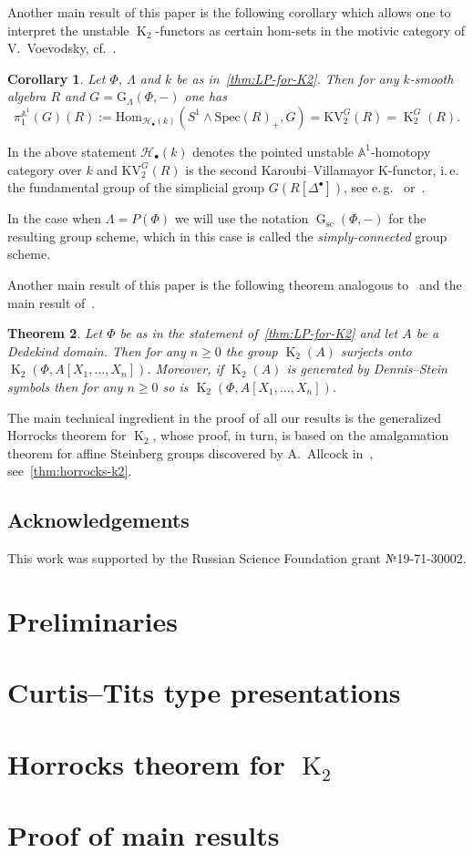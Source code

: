\documentclass[oneside, 10pt]{amsart}
\DeclareMathOperator{\G}{G}
\newcommand{\Gsc}{\G_\mathrm{sc}}
\DeclareMathOperator{\K}{K}
\newtheorem{thm}{Theorem}
\numberwithin{equation}{section}
\numberwithin{thm}{section}
\numberwithin{lemma}{section}
\newtheorem{cor}[thm]{Corollary}
\theoremstyle{definition}
\theoremstyle{remark}
\begin{document}
Another main result of this paper is the following corollary which allows one to
 interpret the unstable $\K_2$-functors as certain hom-sets in the motivic category of V.~Voevodsky,
 cf.~\cite[Corollary~1.2]{LSV2}.
\begin{cor} \label{cor:motivic-pi1} Let $\Phi$, $\Lambda$ and $k$ be as in~\cref{thm:LP-for-K2}.
Then for any $k$-smooth algebra $R$ and $G = \mathrm{G}_{\Lambda}(\Phi, -)$ one has
\[ \pi_1^{\mathbb{A}^1}(G)(R) := \mathrm{Hom}_{\mathscr{H}_{\bullet}(k)}(S^1 \wedge \mathrm{Spec}(R)_+, G) = \mathrm{KV}_2^{G}(R) = \K_2^G(R).\]
\end{cor}
In the above statement $\mathscr{H}_\bullet(k)$ denotes the pointed unstable $\mathbb{A}^1$-homotopy category over $k$ and
$\mathrm{KV}_2^{G}(R)$ is the second Karoubi--Villamayor K-functor, i.\,e. the fundamental group of
 the simplicial group $G(R[\Delta^\bullet])$, see e.\,g.~\cite[\S~3]{Jar83} or~\cite[\S~3.2]{LSV2}.

In the case when $\Lambda = P(\Phi)$ we will use the notation $\Gsc(\Phi, -)$ for the resulting group scheme,
which in this case is called the \textit{simply-connected} group scheme.

Another main result of this paper is the following theorem analogous to~\cite[Theorem~1.1]{St-Ded}
 and the main result of~\cite{Tu83}.
\begin{thm} \label{cor:dedekind}
Let $\Phi$ be as in the statement of~\cref{thm:LP-for-K2} and let $A$ be a Dedekind domain.
Then for any $n \geq 0$ the group $\K_2(A)$ surjects onto $\K_2(\Phi, A[X_1,\ldots, X_n])$.
Moreover, if $\K_2(A)$ is generated by Dennis--Stein symbols then for any $n \geq 0$ so is $\K_2(\Phi, A[X_1,\ldots, X_n])$.
\end{thm}

The main technical ingredient in the proof of all our results is the generalized Horrocks theorem for $\K_2$,
 whose proof, in turn, is based on the amalgamation theorem for affine Steinberg groups discovered by A.~Allcock in~\cite{A13},
 see~\cref{thm:horrocks-k2}.

\subsection{Acknowledgements}
This work was supported by the Russian Science Foundation grant №19-71-30002.

    \section{Preliminaries}\label{sec:preliminaries}
    

    \section{Curtis--Tits type presentations} \label{sec:affine}
    

    \section{Horrocks theorem for $\K_2$} \label{sec:horrocks}
    

    \section{Proof of main results} \label{sec:main}
    

    \printbibliography
\end{document}
